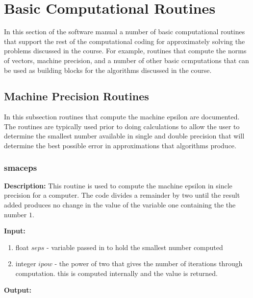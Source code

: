 
\section{\bf Basic Computational Routines}

In this section of the software manual a number of basic computational routines
that support the rest of the computational coding for approximately solving the
problems discussed in the course. For example, routines that compute the norms
of vectors, machine precision, and a number of other basic ccmputations that
can be used as building blocks for the algorithms discussed in the course.

\newpage

\subsection{Machine Precision Routines}

In this subsection routines that compute the machine epsilon are documented.
The routines are typically used prior to doing calculations to allow the user
to determine the smallest number available in single and double precision that
will determine the best possible error in approximations that algorithms
produce.

\subsubsection{smaceps}

\vskip0.1in

\noindent
{\bf Description:} This routine is used to compute the machine epsilon in
sincle precision for a computer. The code divides a remainder by two until the
result added produces no change in the value of the variable one containing the
the number $1$.

\vskip0.1in

\noindent
{\bf Input:}

\vskip0.1in

\begin{enumerate}
\item float $seps$ - variable passed in to hold the smallest number computed
\item integer $ipow$ - the power of two that gives the number of iterations
through computation. this is computed internally and the value is returned.
\end{enumerate}

\vskip0.1in

\noindent
{\bf Output:}

